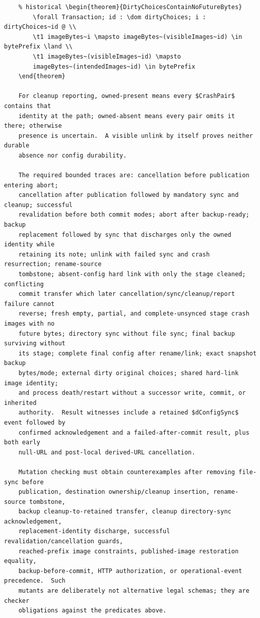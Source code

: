\documentclass{article}
\makeatletter
\newenvironment{theorem}[1]{\medskip\noindent\textbf{Theorem (#1).}\@nameuse{zed}}{\@nameuse{endzed}}
\makeatother
\begin{document}
\begin{verbatim}
	% historical \begin{theorem}{DirtyChoicesContainNoFutureBytes}
		\forall Transaction; id : \dom dirtyChoices; i : dirtyChoices~id @ \\
		\t1 imageBytes~i \mapsto imageBytes~(visibleImages~id) \in bytePrefix \land \\
		\t1 imageBytes~(visibleImages~id) \mapsto
		imageBytes~(intendedImages~id) \in bytePrefix
	\end{theorem}

	For cleanup reporting, owned-present means every $CrashPair$ contains that
	identity at the path; owned-absent means every pair omits it there; otherwise
	presence is uncertain.  A visible unlink by itself proves neither durable
	absence nor config durability.

	The required bounded traces are: cancellation before publication entering abort;
	cancellation after publication followed by mandatory sync and cleanup; successful
	revalidation before both commit modes; abort after backup-ready; backup
	replacement followed by sync that discharges only the owned identity while
	retaining its note; unlink with failed sync and crash resurrection; rename-source
	tombstone; absent-config hard link with only the stage cleaned; conflicting
	commit transfer which later cancellation/sync/cleanup/report failure cannot
	reverse; fresh empty, partial, and complete-unsynced stage crash images with no
	future bytes; directory sync without file sync; final backup surviving without
	its stage; complete final config after rename/link; exact snapshot backup
	bytes/mode; external dirty original choices; shared hard-link image identity;
	and process death/restart without a successor write, commit, or inherited
	authority.  Result witnesses include a retained $dConfigSync$ event followed by
	confirmed acknowledgement and a failed-after-commit result, plus both early
	null-URL and post-local derived-URL cancellation.

	Mutation checking must obtain counterexamples after removing file-sync before
	publication, destination ownership/cleanup insertion, rename-source tombstone,
	backup cleanup-to-retained transfer, cleanup directory-sync acknowledgement,
	replacement-identity discharge, successful revalidation/cancellation guards,
	reached-prefix image constraints, published-image restoration equality,
	backup-before-commit, HTTP authorization, or operational-event precedence.  Such
	mutants are deliberately not alternative legal schemas; they are checker
	obligations against the predicates above.

\end{verbatim}
\end{document}

